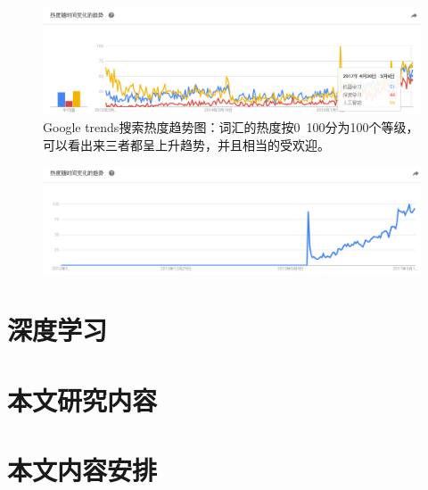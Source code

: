 	\begin{figure}[p]
		\centering
		\includegraphics[width=0.5\linewidth]{figures/1-2}
		\caption{Google trends搜索热度趋势图：词汇的热度按0~100分为100个等级，可以看出来三者都呈上升趋势，并且相当的受欢迎。}
		\label{fig:1-2}
	\end{figure}
	\begin{figure}[p]
	\centering
	\includegraphics[width=0.5\linewidth]{figures/1-3}
	\caption[TensorFlow 在谷歌搜索的热度趋势]{}
	\caption{}
	\label{fig:1-3}
\end{figure}
\section{深度学习}
\subsection{}

		
	\section{本文研究内容}
		
		
	\section{本文内容安排}
	